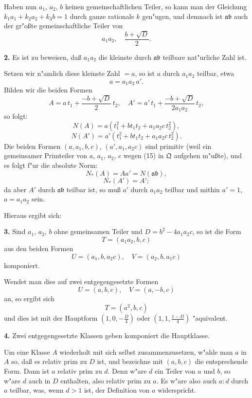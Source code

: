 \documentclass[12pt,a4paper]{article}
\theoremstyle{plain}
\begin{document}
Haben nun $a_1$, $a_2$, $b$ keinen gemeinschaftlichen Teiler, so kann man der Gleichung $k_1 a_1 + k_2 a_2 + k_3 b = 1$ durch ganze rationale $k$ gen"ugen, und demnach ist $\mathfrak{a}\mathfrak{b}$ auch der gr"o\ss te gemeinschaftliche Teiler von
\begin{equation}
a_1 a_2,\quad \frac{b + \sqrt{D}}{2}.
\tag{16}
\end{equation}

\textbf{2.} Es ist zu beweisen, da\ss{} $a_1 a_2$ die kleinste durch $\mathfrak{a}\mathfrak{b}$ teilbare nat"urliche Zahl ist.

Setzen wir n"amlich diese kleinste Zahl $= a$, so ist $a$ durch $a_1 a_2$ teilbar, etwa
\[
a = a_1 a_2\,a'.
\]
Bilden wir die beiden Formen
\[
A = a\,t_1 + \frac{-b + \sqrt{D}}{2}\,t_2,\quad A' = a'\,t_1 + \frac{-b + \sqrt{D}}{2a_1a_2}\,t_2,
\]
so folgt:
\[
N(A) = a(t_1^2 + bt_1t_2 + a_1a_2c\,t_2^2),
\]
\[
N(A') = a'(t_1^2 + bt_1t_2 + a_1a_2c\,t_2^2).
\]
Die beiden Formen $(a, a_1, b, c)$, $(a', a_1, a_2 c)$ sind primitiv (weil ein gemeinsamer Primteiler von $a$, $a_1$, $a_2$, $c$ wegen (15) in $\mathfrak{Q}$ aufgehen m"u\ss te), und es folgt f"ur die absolute Norm:
\[
N_*(A) = Aa' = N(\mathfrak{a}\mathfrak{b}),
\]
\[
N_*(A') = A';
\]
da aber $A'$ durch $\mathfrak{a}\mathfrak{b}$ teilbar ist, so mu\ss{} $a'$ durch $a_1 a_2$ teilbar und mithin $a' = 1$, $a = a_1 a_2$ sein.

Hieraus ergibt sich:

\textbf{3.} Sind $a_1$, $a_2$, $b$ ohne gemeinsamen Teiler und $D = b^2 - 4a_1 a_2 c$, so ist die Form
\[
T = (a_1 a_2, b, c)
\]
aus den beiden Formen
\[
U = (a_1, b, a_2 c),\quad V = (a_2, b, a_1 c)
\]
komponiert.

Wendet man dies auf zwei entgegengesetzte Formen
\[
U = (a, b, c),\quad V = (a, -b, c)
\]
an, so ergibt sich
\[
T = (a^2, b, c)
\]
und dies ist mit der Hauptform $(1, 0, -\frac{D}{4})$ oder $(1, 1, \frac{1-D}{4})$ "aquivalent.

\textbf{4.} Zwei entgegengesetzte Klassen geben komponiert die Hauptklasse.

Um eine Klasse $A$ wiederholt mit sich selbst zusammenzusetzen, w"ahle man $a$ in $A$ so, da\ss{} es relativ prim zu $D$ ist, und bezeichne mit $(a, b, c)$ die entsprechende Form. Dann ist $a$ relativ prim zu $d$. Denn w"are $d$ ein Teiler von $a$ und $b$, so w"are $d$ auch in $D$ enthalten, also relativ prim zu $a$. Es w"are also auch $a:d$ durch $a$ teilbar, was, wenn $d > 1$ ist, der Definition von $a$ widerspricht.
\end{document}
